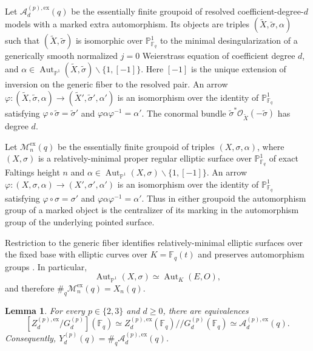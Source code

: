 \documentclass[a4paper,12pt]{amsart}
\newtheorem{lem}[thm]{Lemma}
\theoremstyle{definition}
\newcommand{\cM}{\mathcal{M}}
\newcommand{\Fb}{\mathbb{F}}
\newcommand{\Ac}{\mathcal{A}}
\newcommand{\Pb}{\mathbb{P}}
\newcommand{\Aut}{\operatorname{Aut}}
\renewcommand{\setminus}{\smallsetminus}
\begin{document}
Let $\Ac_d^{(p),\mathrm{ex}}(q)$ be the essentially finite groupoid of resolved coefficient-degree-$d$ models with a marked extra automorphism.  Its objects are triples $(\widetilde X,\widetilde\sigma,\alpha)$ such that $(\widetilde X,\widetilde\sigma)$ is isomorphic over $\Pb^1_{\Fb_q}$ to the minimal desingularization of a generically smooth normalized $j=0$ Weierstrass equation of coefficient degree $d$, and $\alpha\in\Aut_{\Pb^1}(\widetilde X,\widetilde\sigma)\setminus\{1,[-1]\}$.  Here $[-1]$ is the unique extension of inversion on the generic fiber to the resolved pair.  An arrow $\varphi\colon(\widetilde X,\widetilde\sigma,\alpha)\to(\widetilde X',\widetilde\sigma',\alpha')$ is an isomorphism over the identity of $\Pb^1_{\Fb_q}$ satisfying $\varphi\circ\widetilde\sigma=\widetilde\sigma'$ and $\varphi\alpha\varphi^{-1}=\alpha'$.  The conormal bundle $\widetilde\sigma^*\mathcal O_{\widetilde X}(-\widetilde\sigma)$ has degree $d$.

Let $\cM_n^{\mathrm{ex}}(q)$ be the essentially finite groupoid of triples $(X,\sigma,\alpha)$, where $(X,\sigma)$ is a relatively-minimal proper regular elliptic surface over $\Pb^1_{\Fb_q}$ of exact Faltings height $n$ and $\alpha\in\Aut_{\Pb^1}(X,\sigma)\setminus\{1,[-1]\}$.  An arrow $\varphi\colon(X,\sigma,\alpha)\to(X',\sigma',\alpha')$ is an isomorphism over the identity of $\Pb^1_{\Fb_q}$ satisfying $\varphi\circ\sigma=\sigma'$ and $\varphi\alpha\varphi^{-1}=\alpha'$.  Thus in either groupoid the automorphism group of a marked object is the centralizer of its marking in the automorphism group of the underlying pointed surface.

Restriction to the generic fiber identifies relatively-minimal elliptic surfaces over the fixed base with elliptic curves over $K=\Fb_q(t)$ and preserves automorphism groups \cite[Section~4.2]{dJ2}.  In particular,
\begin{equation}\label{eq:generic-fibre-aut}
\Aut_{\Pb^1}(X,\sigma)\simeq\Aut_K(E,O),
\end{equation}
and therefore $\#_q\cM_n^{\mathrm{ex}}(q)=X_n(q)$.

\begin{lem}\label{lem:resolution-bridge}
For every $p\in\{2,3\}$ and $d\geq0$, there are equivalences
\begin{equation}\label{eq:resolution-bridge}
[Z_d^{(p),\mathrm{ex}}/G_d^{(p)}](\Fb_q)
\simeq
Z_d^{(p),\mathrm{ex}}(\Fb_q)\mathbin{//}G_d^{(p)}(\Fb_q)
\simeq
\Ac_d^{(p),\mathrm{ex}}(q).
\end{equation}
Consequently, $Y_d^{(p)}(q)=\#_q\Ac_d^{(p),\mathrm{ex}}(q)$.
\end{lem}
\end{document}
